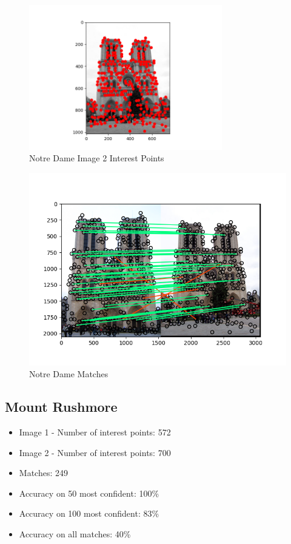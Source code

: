 \documentclass{article}
\begin{document}
\begin{figure}[H] %
    \centering
    \includegraphics[width=0.75\textwidth]{images/notre_dame_figure_2_points.png} %
    \caption{Notre Dame Image 2 Interest Points}
    \label{fig:n_dame_2}
\end{figure}

\begin{figure}[H] %
    \centering
    \includegraphics[width=\textwidth]{images/notre_dame_matches.png} %
    \caption{Notre Dame Matches}
    \label{fig:n_dame_match}
\end{figure}

\subsection{Mount Rushmore}
\begin{itemize}
    \item Image 1 - Number of interest points: 572
    \item Image 2 - Number of interest points: 700
    \item Matches: 249
    \item Accuracy on 50 most confident: 100\%
    \item Accuracy on 100 most confident: 83\%
    \item Accuracy on all matches: 40\%
\end{itemize}
\end{document}
